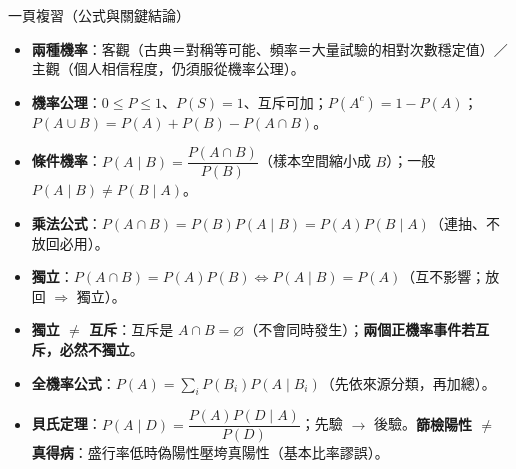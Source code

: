 \documentclass[11pt]{article}
\begin{document}
\begin{補充框}{一頁複習（公式與關鍵結論）}
\begin{itemize}\setlength{\itemsep}{2pt}
\item \textbf{兩種機率}：客觀（古典＝對稱等可能、頻率＝大量試驗的相對次數穩定值）／主觀（個人相信程度，仍須服從機率公理）。
\item \textbf{機率公理}：$0\le P\le1$、$P(S)=1$、互斥可加；$P(A^c)=1-P(A)$；$P(A\cup B)=P(A)+P(B)-P(A\cap B)$。
\item \textbf{條件機率}：$P(A\mid B)=\dfrac{P(A\cap B)}{P(B)}$（樣本空間縮小成 $B$）；一般 $P(A\mid B)\neq P(B\mid A)$。
\item \textbf{乘法公式}：$P(A\cap B)=P(B)P(A\mid B)=P(A)P(B\mid A)$（連抽、不放回必用）。
\item \textbf{獨立}：$P(A\cap B)=P(A)P(B)\iff P(A\mid B)=P(A)$（互不影響；放回 $\Rightarrow$ 獨立）。
\item \textbf{獨立 $\neq$ 互斥}：互斥是 $A\cap B=\varnothing$（不會同時發生）；\textbf{兩個正機率事件若互斥，必然不獨立}。
\item \textbf{全機率公式}：$P(A)=\sum_i P(B_i)P(A\mid B_i)$（先依來源分類，再加總）。
\item \textbf{貝氏定理}：$P(A\mid D)=\dfrac{P(A)P(D\mid A)}{P(D)}$；先驗 $\rightarrow$ 後驗。\textbf{篩檢陽性 $\neq$ 真得病}：盛行率低時偽陽性壓垮真陽性（基本比率謬誤）。
\end{itemize}
\end{補充框}
\end{document}
